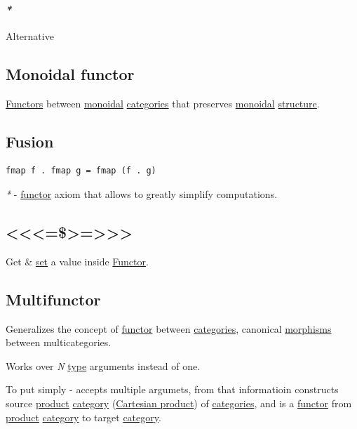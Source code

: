 \documentclass[a4paper,14pt,oneside]{book}
\begin{document}
\paragraph{\emph{*}}
\label{sec:orga2ed7b1}

\label{org0d2dace}Alternative

\subsection{\label{orgf18353d}Monoidal functor}
\label{sec:org30b765e}
\hyperref[org9e4acd0]{Functors} between \hyperref[org914b93b]{monoidal} \hyperref[org8f1742b]{categories} that preserves \hyperref[org914b93b]{monoidal} \hyperref[org105c77d]{structure}.

\subsection{\label{orgb8e15ba}Fusion}
\label{sec:orga046be0}
\begin{verbatim}
fmap f . fmap g = fmap (f . g)
\end{verbatim}

\emph{*} - \hyperref[orgdd3b6fb]{functor} axiom that allows to greatly simplify computations.

\subsection{<<<=\$>=>>>}
\label{sec:orgc311f3a}
Get \& \hyperref[org28abdc9]{set} a value inside \hyperref[orgdd3b6fb]{Functor}.

\subsection{\label{org2ab6cec}Multifunctor}
\label{sec:org47070d3}
Generalizes the concept of \hyperref[orgdd3b6fb]{functor} between \hyperref[org8f1742b]{categories}, canonical \hyperref[orgfb70910]{morphisms} between multicategories.

Works over \emph{N} \hyperref[orgde40363]{type} arguments instead of one.

To put simply - accepts multiple argumets, from that informatioin constructs source \hyperref[org917411a]{product} \hyperref[org82baa03]{category} (\hyperref[org1a506c4]{Cartesian product}) of \hyperref[org8f1742b]{categories}, and is a \hyperref[orgdd3b6fb]{functor} from \hyperref[org917411a]{product} \hyperref[org82baa03]{category} to target \hyperref[org82baa03]{category}.
\end{document}
